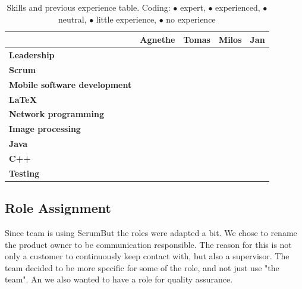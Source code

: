 \begin{table}\centering {}
    \caption[Skills and previous experience]{Skills and previous experience table. Coding:
        \textcolor{green!100}{$\bullet$} expert,
        \textcolor{green!60}{$\bullet$} experienced,
        \textcolor{yellow!75}{$\bullet$} neutral,
        \textcolor{orange!90}{$\bullet$} little experience,
        \textcolor{red!80}{$\bullet$} no experience}
    \label{tab:skills}
    \vspace{2mm}
    \begin{tabular}{lcccc}
    \toprule[0.5mm]
                                & Agnethe   & Tomas & Milos & Jan \\
    \midrule
    \textbf{Leadership                 } &  &  &  &  \\ 
    \textbf{Scrum                      } &  &  &  &  \\ 
    \textbf{Mobile software development} &  &  &  &  \\ 
    \textbf{\LaTeX                     } &  &  &  &  \\ 
    \textbf{Network programming        } &  &  &  &  \\ 
    \textbf{Image processing           } &  &  &  &  \\ 
    \textbf{Java                       } &  &  &  &  \\ 
    \textbf{C++                        } &  &  &  &  \\ 
    \textbf{Testing                    } &  &  &  &  \\
    \bottomrule[0.5mm]
    \end{tabular}
\end{table}

\subsection{Role Assignment}

Since team is using ScrumBut the roles were adapted a bit. We chose to rename the product owner to be communication responsible. The reason for this is not only a customer to continuously keep contact with, but also a supervisor. The team decided to be more specific for some of the role, and not just use "the team". An we also wanted to have a role for quality assurance. 

